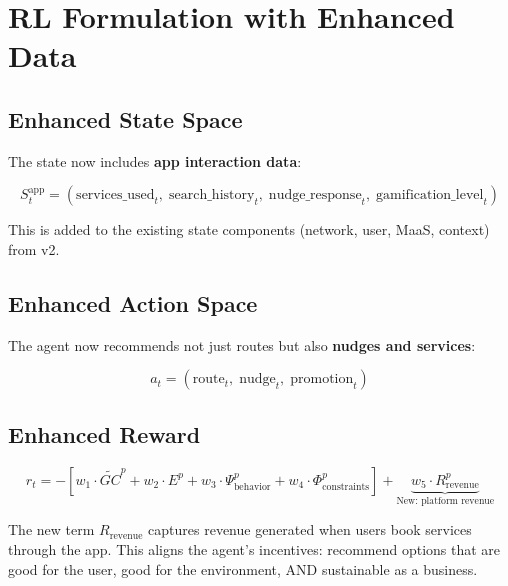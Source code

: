 \documentclass[11pt,a4paper]{article}
\begin{document}
\section{RL Formulation with Enhanced Data}
\label{sec:rl}

\subsection{Enhanced State Space}

The state now includes \textbf{app interaction data}:

\begin{equation}
    S_t^{\text{app}} = \left( \text{services\_used}_t,\; \text{search\_history}_t,\; \text{nudge\_response}_t,\; \text{gamification\_level}_t \right)
\end{equation}

This is added to the existing state components (network, user, MaaS, context) from v2.

\subsection{Enhanced Action Space}

The agent now recommends not just routes but also \textbf{nudges and services}:

\begin{equation}
    a_t = \left( \text{route}_t,\; \text{nudge}_t,\; \text{promotion}_t \right)
\end{equation}

\subsection{Enhanced Reward}

\begin{equation}
\boxed{
    r_t = -\left[ w_1 \cdot \widetilde{GC}^{p} + w_2 \cdot E^{p} + w_3 \cdot \Psi_{\text{behavior}}^{p} + w_4 \cdot \Phi_{\text{constraints}}^{p} \right] + \underbrace{w_5 \cdot R_{\text{revenue}}^{p}}_{\text{New: platform revenue}}
}
\end{equation}

The new term $R_{\text{revenue}}$ captures revenue generated when users book services through the app. This aligns the agent's incentives: recommend options that are good for the user, good for the environment, AND sustainable as a business.
\end{document}
